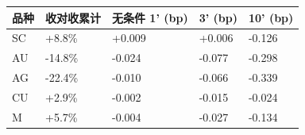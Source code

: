 \begin{tabular}{lllll}
\toprule
品种 & 收对收累计 & 无条件 1' (bp) & 3' (bp) & 10' (bp) \\
\midrule
SC & +8.8\% & +0.009 & +0.006 & -0.126 \\
AU & -14.8\% & -0.024 & -0.077 & -0.298 \\
AG & -22.4\% & -0.010 & -0.066 & -0.339 \\
CU & +2.9\% & -0.002 & -0.015 & -0.024 \\
M & +5.7\% & -0.004 & -0.027 & -0.134 \\
\bottomrule
\end{tabular}
